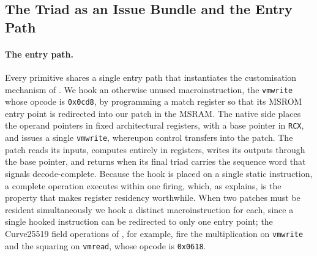 \subsection{The Triad as an Issue Bundle and the Entry Path}
\label{sec:triads-packing}

\paragraph{The entry path.}
Every primitive shares a single entry path that instantiates the customisation
mechanism of . We hook an otherwise unused
macroinstruction, the \texttt{vmwrite} whose opcode is \texttt{0x0cd8}, by
programming a match register so that its MSROM entry point is redirected into
our patch in the MSRAM. The native side places the operand pointers in fixed
architectural registers, with a base pointer in \texttt{RCX}, and issues a
single \texttt{vmwrite}, whereupon control transfers into the patch. The patch
reads its inputs, computes entirely in registers, writes its outputs through
the base pointer, and returns when its final triad carries the sequence word
that signals decode-complete. Because the hook is placed on a single static
instruction, a complete operation executes within one firing, which, as
 explains, is the property that makes register residency
worthwhile. When two patches must be resident simultaneously we hook a distinct
macroinstruction for each, since a single hooked instruction can be redirected
to only one entry point; the Curve25519 field operations of
, for example, fire the multiplication on \texttt{vmwrite}
and the squaring on \texttt{vmread}, whose opcode is \texttt{0x0618}.

